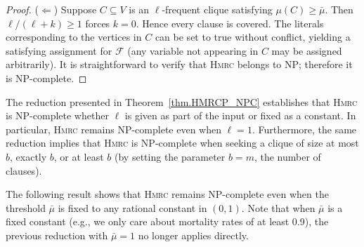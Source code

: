 \begin{proof}
    ($\Leftarrow$) Suppose $C \subseteq V$ is an $\ell$-frequent clique satisfying $\mu(C) \ge \bar \mu$. Then $\ell/(\ell+k) \ge 1$ forces $k=0$. Hence every clause is covered. The literals corresponding to the vertices in $C$ can be set to true without conflict, yielding a satisfying assignment for $\mathcal{F}$ (any variable not appearing in $C$ may be assigned arbitrarily). It is straightforward to verify that \textsc{Hmrc} belongs to NP; therefore it is NP-complete.
\end{proof}

\begin{remark}
    The reduction presented in Theorem~\ref{thm.HMRCP_NPC} establishes that \textsc{Hmrc} is NP-complete whether $\ell$ is given as part of the input or fixed as a constant. In particular, \textsc{Hmrc} remains NP-complete even when $\ell=1$. Furthermore, the same reduction implies that \textsc{Hmrc} is NP-complete when seeking a clique of size at most $b$, exactly $b$, or at least $b$ (by setting the parameter $b=m$, the number of clauses).
\end{remark}

The following result shows that \textsc{Hmrc} remains NP-complete even when the threshold $\bar\mu$ is fixed to any rational constant in $(0,1)$. Note that when $\bar\mu$ is a fixed constant (e.g., we only care about mortality rates of at least 0.9), the previous reduction with $\bar\mu=1$ no longer applies directly.

